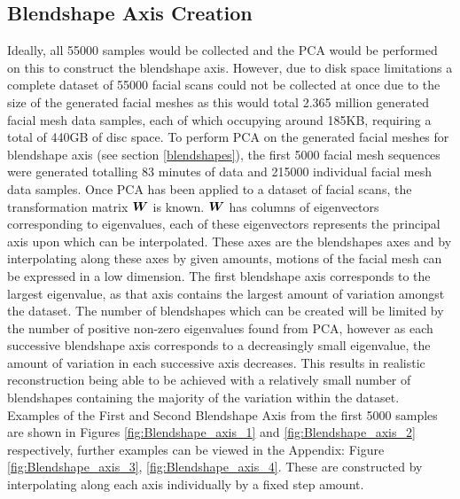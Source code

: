 \subsection{Blendshape Axis Creation}
Ideally, all 55000 samples would be collected and the PCA would be performed on this to construct the blendshape axis.
However, due to disk space limitations a complete dataset of 55000 facial scans could not be collected at once due to the size of the generated facial meshes as this would total 2.365 million generated facial mesh data samples, each of which occupying around 185KB, requiring a total of 440GB of disc space.
To perform PCA on the generated facial meshes for blendshape axis (see section \ref{blendshapes}), the first 5000 facial mesh sequences were generated totalling 83 minutes of data and 215000 individual facial mesh data samples. 
Once PCA has been applied to a dataset of facial scans, the transformation matrix ${\boldsymbol{{W}}}$ is known.
${\boldsymbol{{W}}}$ has columns of eigenvectors corresponding to eigenvalues, each of these eigenvectors represents the principal axis upon which can be interpolated.
These axes are the blendshapes axes and by interpolating along these axes by given amounts, motions of the facial mesh can be expressed in a low dimension.
The first blendshape axis corresponds to the largest eigenvalue, as that axis contains the largest amount of variation amongst the dataset.
The number of blendshapes which can be created will be limited by the number of positive non-zero eigenvalues found from PCA, however as each successive blendshape axis corresponds to a decreasingly small eigenvalue, the amount of variation in each successive axis decreases. 
This results in realistic reconstruction being able to be achieved with a relatively small number of blendshapes containing the majority of the variation within the dataset.
Examples of the First and Second Blendshape Axis from the first 5000 samples are shown in Figures \ref{fig:Blendshape_axis_1} and \ref{fig:Blendshape_axis_2} respectively, further examples can be viewed in the Appendix: Figure \ref{fig:Blendshape_axis_3}, \ref{fig:Blendshape_axis_4}.
These are constructed by interpolating along each axis individually by a fixed step amount.


